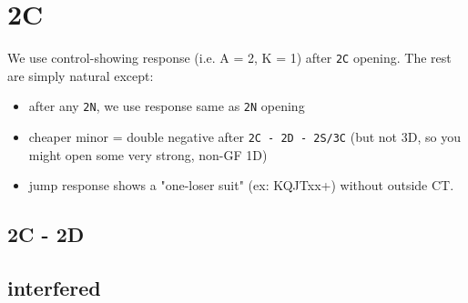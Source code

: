 \section{2C}

We use control-showing response (i.e. A = 2, K = 1) after \texttt{2C} opening. The rest are simply natural except:
\begin{itemize}
    \setlength\itemsep{0pt}
    \item after any \texttt{2N}, we use response same as \texttt{2N} opening
    \item cheaper minor = double negative after \texttt{2C - 2D - 2S/3C} (but not 3D, so you might open some very strong, non-GF 1D)
    \item jump response shows a "one-loser suit" (ex: KQJTxx+) without outside CT.
\end{itemize}


\subsection{2C - 2D}


\subsection{interfered}


